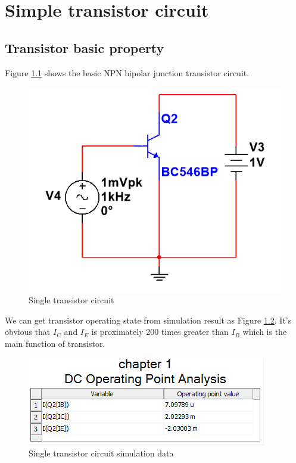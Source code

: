 \chapter{Simple transistor circuit}

\section{Transistor basic property}
Figure \ref{fig:singletransistorcircuit} shows the basic NPN bipolar junction transistor circuit.

\begin{figure}[htbp]
\centering
\includegraphics[scale=0.6]{"../Photo/Chap1/single transistor circuit"}
\caption{Single transistor circuit}
\label{fig:singletransistorcircuit}

\end{figure}

 We can get transistor operating state from simulation result as Figure \ref{fig:single transistor circuit data tablet}. It's obvious that $I_C$ and $I_E$ is proximately 200 times greater than $I_B$ which is the main function of transistor.

 \begin{figure}[htbp]
 	\centering
 	\includegraphics[scale=1]{"../Photo/Chap1/single transistor circuit data table"}
 	\caption{Single transistor circuit simulation data}
 	\label{fig:single transistor circuit data tablet}
 	
 \end{figure}

